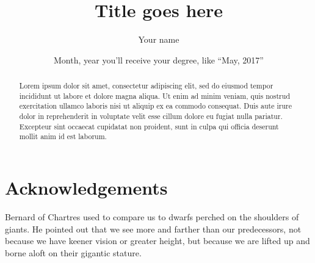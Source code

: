 \documentclass[letterpaper,11pt]{yalephd}
\begin{document}
\title{Title goes here}
\author{Your name}
\date{Month, year you'll receive your degree, like ``May, 2017''}

\frontmatter

\begin{abstract}
Lorem ipsum dolor sit amet, consectetur adipiscing elit, sed do eiusmod tempor incididunt ut labore et dolore magna aliqua. Ut enim ad minim veniam, quis nostrud exercitation ullamco laboris nisi ut aliquip ex ea commodo consequat. Duis aute irure dolor in reprehenderit in voluptate velit esse cillum dolore eu fugiat nulla pariatur. Excepteur sint occaecat cupidatat non proident, sunt in culpa qui officia deserunt mollit anim id est laborum.
\end{abstract}


\maketitle
{}
\tableofcontents
\listoffigures 
\listoftables %

\chapter{Acknowledgements}
Bernard of Chartres used to compare us to dwarfs perched on the shoulders of giants. He pointed out that we see more and farther than our predecessors, not because we have keener vision or greater height, but because we are lifted up and borne aloft on their gigantic stature.

\mainmatter






\newpage 
\appendix

\end{document}
